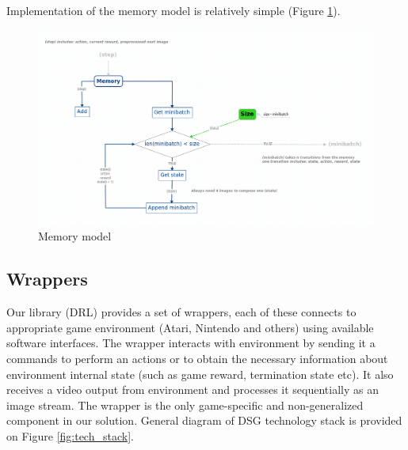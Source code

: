 \documentclass[a4paper,oneside,dvipsnames]{article}
\begin{document}
Implementation of the memory model is relatively simple (Figure \ref{fig:mem_model}).
\begin{figure}[h]
    \centering
    \includegraphics[scale=0.29]{memory_model.png}
    \caption{Memory model}
    \label{fig:mem_model}
\end{figure}

\subsection[Wrappers]{Wrappers}

Our library (DRL) provides a set of wrappers, each of these connects to appropriate game environment (Atari, Nintendo and others) using available software interfaces. The wrapper interacts with environment by sending it a commands to perform an actions or to obtain the necessary information about environment internal state (such as game reward, termination state etc). It also receives a video output from environment and processes it sequentially as an image stream. The wrapper is the only game-specific and non-generalized component in our solution. General diagram of DSG technology stack is provided on Figure \ref{fig:tech_stack}.
\end{document}

